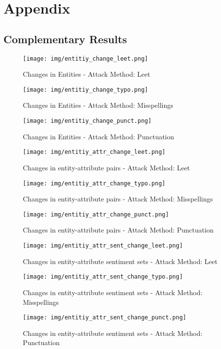 
\section{Appendix}
\subsection{Complementary Results}
\begin{figure}
    \centering
    \texttt{[image: img/entitiy\_change\_leet.png]}
    \caption{Changes in Entities - Attack Method: Leet}
    \label{fig:entity_change_leet}
\end{figure}
\begin{figure}
    \centering
    \texttt{[image: img/entitiy\_change\_typo.png]}
    \caption{Changes in Entities - Attack Method: Misspellings}
    \label{fig:entity_change_typo}
\end{figure}
\begin{figure}
    \centering
    \texttt{[image: img/entitiy\_change\_punct.png]}
    \caption{Changes in Entities - Attack Method: Punctuation}
    \label{fig:entity_change_punct}
\end{figure}
\begin{figure}
    \centering
    \texttt{[image: img/entitiy\_attr\_change\_leet.png]}
    \caption{Changes in entity-attribute pairs - Attack Method: Leet}
    \label{fig:entity_attr_change_leet}
\end{figure}
\begin{figure}
    \centering
    \texttt{[image: img/entitiy\_attr\_change\_typo.png]}
    \caption{Changes in entity-attribute pairs - Attack Method: Misspellings}
    \label{fig:entity_attr_change_typo}
\end{figure}
\begin{figure}
    \centering
    \texttt{[image: img/entitiy\_attr\_change\_punct.png]}
    \caption{Changes in entity-attribute pairs - Attack Method: Punctuation}
    \label{fig:entity_attr_change_punct}
\end{figure}
\begin{figure}
    \centering
    \texttt{[image: img/entitiy\_attr\_sent\_change\_leet.png]}
    \caption{Changes in entity-attribute sentiment sets - Attack Method: Leet}
    \label{fig:entity_attr_sent_change_leet}
\end{figure}
\begin{figure}
    \centering
    \texttt{[image: img/entitiy\_attr\_sent\_change\_typo.png]}
    \caption{Changes in entity-attribute sentiment sets - Attack Method: Misspellings}
    \label{fig:entity_attr_sent_change_typo}
\end{figure}
\begin{figure}
    \centering
    \texttt{[image: img/entitiy\_attr\_sent\_change\_punct.png]}
    \caption{Changes in entity-attribute sentiment sets - Attack Method: Punctuation}
    \label{fig:entity_attr_sent_change_punct}
\end{figure}